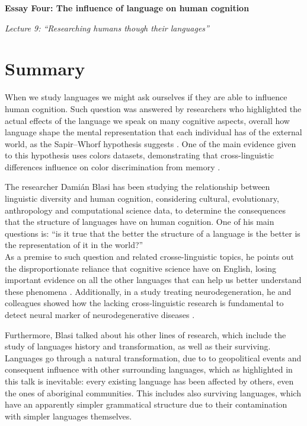 \begin{flushleft}
    {\fontsize{16}{18}\selectfont\textbf{Essay Four: The influence of language on human cognition}} 

    \bigskip

    {\fontsize{14}{16}\selectfont \textit{Lecture 9: “Researching humans though their languages”}}
\end{flushleft}

\section*{Summary}
When we study languages we might ask ourselves if they are able to influence human cognition. Such question was answered by researchers who highlighted the actual effects of the language we speak on many cognitive aspects, overall how language shape the mental representation that each individual has of the external world, as the Sapir–Whorf hypothesis suggests \parencite{Koerner_1992}. One of the main evidence given to this hypothesis uses colors datasets, demonstrating that cross-linguistic differences influence on color discrimination from memory \parencite{Cibelli_2016}.

The researcher Damián Blasi has been studying the relationship between linguistic diversity and human cognition, considering cultural, evolutionary, anthropology and computational science data, to determine the consequences that the structure of languages have on human cognition. One of his main questions is: “is it true that the better the structure of a language is the better is the representation of it in the world?” \\ 
As a premise to such question and related crosse-linguistic topics, he points out the disproportionate reliance that cognitive science have on English, losing important evidence on all the other languages that can help us better understand these phenomena \parencite{Blasi_2022}. Additionally, in a study treating neurodegeneration, he and colleagues showed how the lacking cross-linguistic research is fundamental to detect neural marker of neurodegenerative diseases \parencite{Garcia_2023}. 

Furthermore, Blasi talked about his other lines of research, which include the study of languages history and transformation, as well as their surviving. Languages go through a natural transformation, due to to geopolitical events and consequent influence with other surrounding languages, which as highlighted in this talk is inevitable: every existing language has been affected by others, even the ones of aboriginal communities. This includes also surviving languages, which have an apparently simpler grammatical structure due to their contamination with simpler languages themselves.

